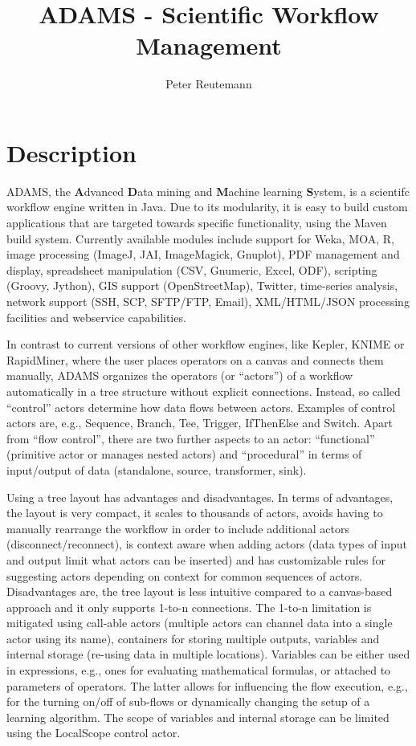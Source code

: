 \documentclass[a4paper,10pt]{article}
\title{ADAMS - Scientific Workflow Management}
\author{Peter Reutemann}
\begin{document}
\maketitle

\section{Description}
ADAMS, the \textbf{A}dvanced \textbf{D}ata mining and \textbf{M}achine learning \textbf{S}ystem, is a scientifc workflow engine written in Java. Due to its modularity, it is easy to build custom applications that are targeted towards specific functionality, using the Maven build system. Currently available modules include support for Weka, MOA, R, image processing (ImageJ, JAI, ImageMagick, Gnuplot), PDF management and display, spreadsheet manipulation (CSV, Gnumeric, Excel, ODF), scripting (Groovy, Jython), GIS support (OpenStreetMap), Twitter, time-series analysis, network support (SSH, SCP, SFTP/FTP, Email), XML/HTML/JSON processing facilities and webservice capabilities.

In contrast to current versions of other workflow engines, like Kepler, KNIME or RapidMiner, where the user places operators on a canvas and connects them manually, ADAMS organizes the operators (or ``actors'') of a workflow automatically in a tree structure without explicit connections. Instead, so called ``control'' actors determine how data flows between actors. Examples of control actors are, e.g., Sequence, Branch, Tee, Trigger, IfThenElse and Switch. Apart from ``flow control'', there are two further aspects to an actor: ``functional'' (primitive actor or manages nested actors) and ``procedural'' in terms of input/output of data (standalone, source, transformer, sink).

Using a tree layout has advantages and disadvantages. In terms of advantages, the layout is very compact, it scales to thousands of actors, avoids having to manually rearrange the workflow in order to include additional actors (disconnect/reconnect), is context aware when adding actors (data types of input and output limit what actors can be inserted) and has customizable rules for suggesting actors depending on context for common sequences of actors. Disadvantages are, the tree layout is less intuitive compared to a canvas-based approach and it only supports 1-to-n connections. The 1-to-n limitation is mitigated using call-able actors (multiple actors can channel data into a single actor using its name), containers for storing multiple outputs, variables and internal storage (re-using data in multiple locations). Variables can be either used in expressions, e.g., ones for evaluating mathematical formulas, or attached to parameters of operators. The latter allows for influencing the flow execution, e.g., for the turning on/off of sub-flows or dynamically changing the setup of a learning algorithm. The scope of variables and internal storage can be limited using the LocalScope control actor.
\end{document}
